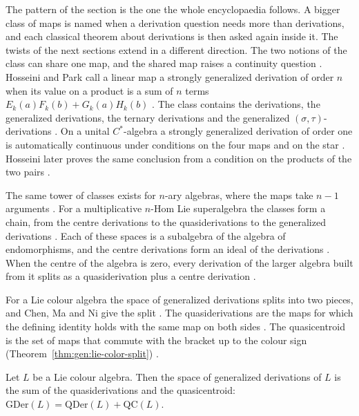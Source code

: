 The pattern of the section is the one the whole encyclopaedia follows.
A bigger class of maps is named when a derivation question needs more than
derivations, and each classical theorem about derivations is then asked again
inside it.
The twists of the next sections extend in a different direction.
The two notions of the class can share one map, and the shared map raises a
continuity question \cite[p.~1]{HosseiniPark2023}. Hosseini and Park
call a linear map a
strongly generalized derivation of order $n$ when its value on a product is a
sum of $n$ terms $E_k(a)F_k(b)+G_k(a)H_k(b)$
\cite[Definition~2.1, p.~3]{HosseiniPark2023}. The class contains the
derivations, the generalized derivations, the ternary derivations and the
generalized $(\sigma,\tau)$-derivations \cite[p.~2]{Hosseini2025Strongly}. On
a unital $C^{*}$-algebra a strongly generalized derivation of order one is
automatically continuous under conditions on the four maps and on the star
\cite[Theorem~2.9, p.~6]{HosseiniPark2023}. Hosseini later proves the
same conclusion from a condition on the products of the two pairs
\cite[Theorem~2.1, p.~5]{Hosseini2025Strongly}.

The same tower of classes exists for $n$-ary algebras, where the maps take
$n-1$ arguments \cite[p.~15]{ZhouFan2016nHom}. For a multiplicative $n$-Hom
Lie superalgebra the classes form a chain, from the centre derivations to the
quasiderivations to the generalized derivations
\cite[Proposition~3.1, p.~6]{ZhouFan2016nHom}. Each of these spaces is a
subalgebra of the algebra of endomorphisms, and the centre derivations form an
ideal of the derivations \cite[Proposition~3.1, p.~6]{ZhouFan2016nHom}. When
the centre of the algebra is zero, every derivation of the larger algebra built
from it splits as a quasiderivation plus a centre derivation
\cite[Proposition~4.3, p.~15]{ZhouFan2016nHom}.

For a Lie colour algebra the space of generalized derivations splits into two
pieces, and Chen, Ma and Ni give the split \cite[p.~923]{ChenMaNi2013}. The
quasiderivations are the maps for which the defining identity holds with the same
map on both sides \cite[Definition~1.5, p.~925]{ChenMaNi2013}. The quasicentroid
is the set of maps that commute with the bracket up to the colour sign (Theorem~\ref{thm:gen:lie-color-split})
\cite[Definition~1.7, p.~925]{ChenMaNi2013}.\begin{theorem}\label{thm:gen:lie-color-split}
Let $L$ be a Lie colour algebra. Then the space of generalized derivations of $L$
is the sum of the quasiderivations and the quasicentroid:
$\mathrm{GDer}(L)=\mathrm{QDer}(L)+\mathrm{QC}(L)$.
\end{theorem}

